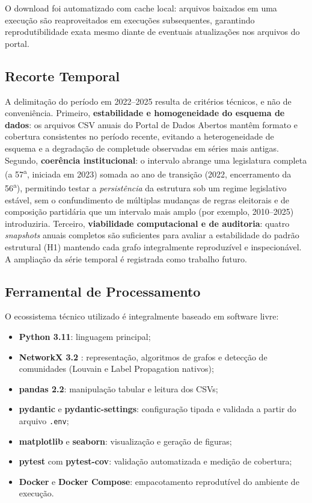 \documentclass[
      12pt,
      a4paper,
      openright,
      oneside,
      chapter=TITLE,
      section=TITLE,
      english,
      french,
      spanish,
      brazilian
    ]{abntex2}
\begin{document}
    O download foi automatizado com cache local: arquivos baixados em uma execução são reaproveitados em execuções subsequentes, garantindo reprodutibilidade exata mesmo diante de eventuais atualizações nos arquivos do portal.
    
    \subsection{Recorte Temporal}
    
    A delimitação do período em 2022--2025 resulta de critérios técnicos, e não de conveniência. Primeiro, \textbf{estabilidade e homogeneidade do esquema de dados}: os arquivos CSV anuais do Portal de Dados Abertos mantêm formato e cobertura consistentes no período recente, evitando a heterogeneidade de esquema e a degradação de completude observadas em séries mais antigas. Segundo, \textbf{coerência institucional}: o intervalo abrange uma legislatura completa (a 57\textsuperscript{a}, iniciada em 2023) somada ao ano de transição (2022, encerramento da 56\textsuperscript{a}), permitindo testar a \textit{persistência} da estrutura sob um regime legislativo estável, sem o confundimento de múltiplas mudanças de regras eleitorais e de composição partidária que um intervalo mais amplo (por exemplo, 2010--2025) introduziria. Terceiro, \textbf{viabilidade computacional e de auditoria}: quatro \textit{snapshots} anuais completos são suficientes para avaliar a estabilidade do padrão estrutural (H1) mantendo cada grafo integralmente reproduzível e inspecionável. A ampliação da série temporal é registrada como trabalho futuro.
    
    
    
    \subsection{Ferramental de Processamento}
    
    O ecossistema técnico utilizado é integralmente baseado em software livre:
    
    \begin{itemize}
        \item \textbf{Python 3.11}: linguagem principal;
        \item \textbf{NetworkX 3.2} \cite{networkx}: representação, algoritmos de grafos e detecção de comunidades (Louvain e Label Propagation nativos);
        \item \textbf{pandas 2.2}: manipulação tabular e leitura dos CSVs;
        \item \textbf{pydantic} e \textbf{pydantic-settings}: configuração tipada e validada a partir do arquivo \texttt{.env};
        \item \textbf{matplotlib} e \textbf{seaborn}: visualização e geração de figuras;
        \item \textbf{pytest} com \textbf{pytest-cov}: validação automatizada e medição de cobertura;
        \item \textbf{Docker} e \textbf{Docker Compose}: empacotamento reprodutível do ambiente de execução.
    \end{itemize}
    
\end{document}
